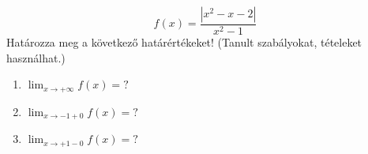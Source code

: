 \documentclass[11pt]{scrartcl}
\begin{document}
\[
	f(x) = \frac{\left| x^2 - x - 2 \right|}{x^2 - 1}
\]
Határozza meg a következő határértékeket! (Tanult szabályokat, tételeket
használhat.)
\begin{enumerate}
	\item \(\displaystyle \lim_{x \to +\infty} f(x) = ?\)

	\item \(\displaystyle \lim_{x \to -1 + 0} f(x) = ?\)

	\item \(\displaystyle \lim_{x \to +1 - 0} f(x) = ?\)
\end{enumerate}
\end{document}

